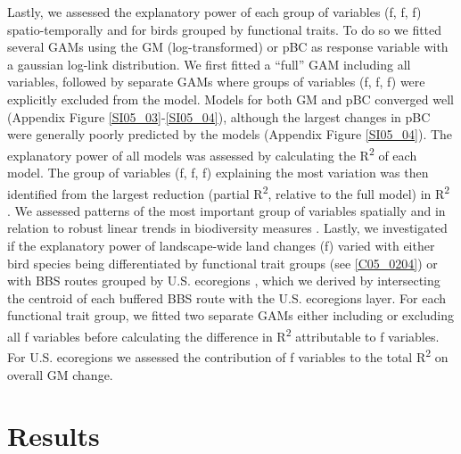 Lastly, we assessed the explanatory power of each group of variables (f, f, f) spatio-temporally and for birds grouped by functional traits. To do so we fitted several GAMs using the GM (log-transformed) or pBC as response variable with a gaussian log-link distribution. We first fitted a “full” GAM including all variables, followed by separate GAMs where groups of variables (f, f, f) were explicitly excluded from the model. Models for both GM and pBC converged well (Appendix Figure \ref{SI05_03}-\ref{SI05_04}), although the largest changes in pBC were generally poorly predicted by the models (Appendix Figure \ref{SI05_04}). The explanatory power of all models was assessed by calculating the R\textsuperscript{2} of each model. The group of variables (f, f, f) explaining the most variation was then identified from the largest reduction (partial R\textsuperscript{2}, relative to the full model) in R\textsuperscript{2} \citep{Papagiannopoulou2017}. We assessed patterns of the most important group of variables spatially and in relation to robust linear trends in biodiversity measures \citep[fitted using the MASS package, ver. 7.3-49,][]{Venables2002}. Lastly, we investigated if the explanatory power of landscape-wide land changes (f) varied with either bird species being differentiated by functional trait groups (see \ref{C05_0204}) or with BBS routes grouped by U.S. ecoregions \citep[Level 1,][]{Omernik1987}, which we derived by intersecting the centroid of each buffered BBS route with the U.S. ecoregions layer. For each functional trait group, we fitted two separate GAMs either including or excluding all f variables before calculating the difference in R\textsuperscript{2} attributable to f variables. For U.S. ecoregions we assessed the contribution of f variables to the total R\textsuperscript{2} on overall GM change.

\section{Results}
\label{C05_03}

